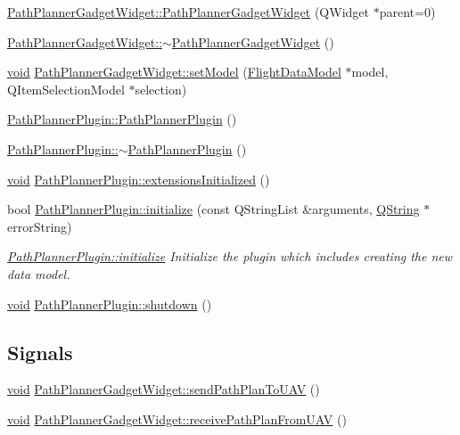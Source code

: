 \begin{DoxyCompactItemize}
\hyperlink{group___path_planner_gadget_plugin_gaa5a16b8b25c368ba63764246fe417001}{Path\-Planner\-Gadget\-Widget\-::\-Path\-Planner\-Gadget\-Widget} (Q\-Widget $\ast$parent=0)
\item 
\hyperlink{group___path_planner_gadget_plugin_ga7a9758a518eef6a55f9386ed8a552e29}{Path\-Planner\-Gadget\-Widget\-::$\sim$\-Path\-Planner\-Gadget\-Widget} ()
\item 
\hyperlink{group___u_a_v_objects_plugin_ga444cf2ff3f0ecbe028adce838d373f5c}{void} \hyperlink{group___path_planner_gadget_plugin_ga906747f7512d66ab544506fdd8ba5fc2}{Path\-Planner\-Gadget\-Widget\-::set\-Model} (\hyperlink{class_flight_data_model}{Flight\-Data\-Model} $\ast$model, Q\-Item\-Selection\-Model $\ast$selection)
\item 
\hyperlink{group___path_planner_gadget_plugin_ga754f3760ad2179865dabf983f1bcfb04}{Path\-Planner\-Plugin\-::\-Path\-Planner\-Plugin} ()
\item 
\hyperlink{group___path_planner_gadget_plugin_gabb5e520f0952f6c023ae86b5bb903197}{Path\-Planner\-Plugin\-::$\sim$\-Path\-Planner\-Plugin} ()
\item 
\hyperlink{group___u_a_v_objects_plugin_ga444cf2ff3f0ecbe028adce838d373f5c}{void} \hyperlink{group___path_planner_gadget_plugin_ga21fa3c1e21372d56ddf70b6fe5973897}{Path\-Planner\-Plugin\-::extensions\-Initialized} ()
\item 
bool \hyperlink{group___path_planner_gadget_plugin_ga08ada1f91b2f37c282cbabdcdb7af6d8}{Path\-Planner\-Plugin\-::initialize} (const Q\-String\-List \&arguments, \hyperlink{group___u_a_v_objects_plugin_gab9d252f49c333c94a72f97ce3105a32d}{Q\-String} $\ast$error\-String)
\begin{DoxyCompactList}\small\item\em \hyperlink{group___path_planner_gadget_plugin_ga08ada1f91b2f37c282cbabdcdb7af6d8}{Path\-Planner\-Plugin\-::initialize} Initialize the plugin which includes creating the new data model. \end{DoxyCompactList}\item 
\hyperlink{group___u_a_v_objects_plugin_ga444cf2ff3f0ecbe028adce838d373f5c}{void} \hyperlink{group___path_planner_gadget_plugin_ga86bbf998d72f805f00576608baf627ba}{Path\-Planner\-Plugin\-::shutdown} ()
\end{DoxyCompactItemize}
\subsection*{Signals}
\begin{DoxyCompactItemize}
\item 
\hyperlink{group___u_a_v_objects_plugin_ga444cf2ff3f0ecbe028adce838d373f5c}{void} \hyperlink{group___path_planner_gadget_plugin_ga65ade0264344b0cf65707fda3419f091}{Path\-Planner\-Gadget\-Widget\-::send\-Path\-Plan\-To\-U\-A\-V} ()
\item 
\hyperlink{group___u_a_v_objects_plugin_ga444cf2ff3f0ecbe028adce838d373f5c}{void} \hyperlink{group___path_planner_gadget_plugin_ga4da1c30707d66e4e343263500573eb39}{Path\-Planner\-Gadget\-Widget\-::receive\-Path\-Plan\-From\-U\-A\-V} ()
\end{DoxyCompactItemize}


